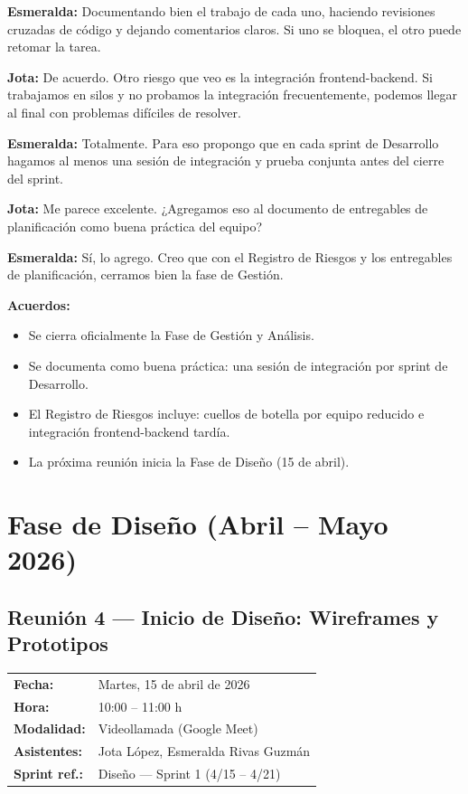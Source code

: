 \documentclass[12pt, a4paper]{article}
\makeatletter
\newcommand{\actaheader}[5]{%
  \begin{mdframed}[
    backgroundcolor=sectionbg,
    linecolor=bordercolor,
    linewidth=1pt,
    innerleftmargin=12pt, innerrightmargin=12pt,
    innertopmargin=10pt, innerbottommargin=10pt,
    skipabove=8pt, skipbelow=8pt
  ]
  \begin{tabularx}{\linewidth}{@{}lX@{}}
    \textbf{Fecha:}       & #1 \\[2pt]
    \textbf{Hora:}        & #2 \\[2pt]
    \textbf{Modalidad:}   & #3 \\[2pt]
    \textbf{Asistentes:}  & #4 \\[2pt]
    \textbf{Sprint ref.:} & #5 \\
  \end{tabularx}
  \end{mdframed}%
}
\newcommand{\jota}[1]{\noindent\textbf{\color{primary}Jota:} #1\par\smallskip}
\newcommand{\esme}[1]{\noindent\textbf{\color{accentgreen}Esmeralda:} #1\par\smallskip}
\makeatother
\begin{document}
\esme{Documentando bien el trabajo de cada uno, haciendo revisiones cruzadas de código y dejando comentarios claros. Si uno se bloquea, el otro puede retomar la tarea.}

\jota{De acuerdo. Otro riesgo que veo es la integración frontend-backend. Si trabajamos en silos y no probamos la integración frecuentemente, podemos llegar al final con problemas difíciles de resolver.}

\esme{Totalmente. Para eso propongo que en cada sprint de Desarrollo hagamos al menos una sesión de integración y prueba conjunta antes del cierre del sprint.}

\jota{Me parece excelente. ¿Agregamos eso al documento de entregables de planificación como buena práctica del equipo?}

\esme{Sí, lo agrego. Creo que con el Registro de Riesgos y los entregables de planificación, cerramos bien la fase de Gestión.}

\begin{acuerdobox}
\textbf{Acuerdos:}
\begin{itemize}[leftmargin=1.2em, topsep=2pt]
  \item Se cierra oficialmente la Fase de Gestión y Análisis.
  \item Se documenta como buena práctica: una sesión de integración por sprint de Desarrollo.
  \item El Registro de Riesgos incluye: cuellos de botella por equipo reducido e integración frontend-backend tardía.
  \item La próxima reunión inicia la Fase de Diseño (15 de abril).
\end{itemize}
\end{acuerdobox}

\section{Fase de Diseño (Abril -- Mayo 2026)}

\subsection{Reunión 4 — Inicio de Diseño: Wireframes y Prototipos}
\actaheader
  {Martes, 15 de abril de 2026}
  {10:00 -- 11:00 h}
  {Videollamada (Google Meet)}
  {Jota López, Esmeralda Rivas Guzmán}
  {Diseño — Sprint 1 (4/15 -- 4/21)}
\end{document}
